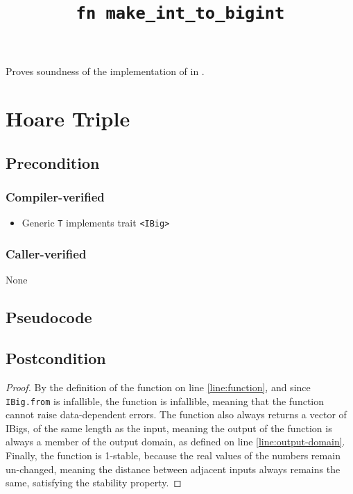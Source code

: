 \documentclass{article}
\title{\texttt{fn make\_int\_to\_bigint}}
\author{\MichaelShoemateAuthor}
\date{}
\begin{document}
\maketitle

\contrib
Proves soundness of the implementation of  in .

\section{Hoare Triple}
\subsection*{Precondition}
\subsubsection*{Compiler-verified}

\begin{itemize}
    \item Generic \texttt{T} implements trait \texttt{<IBig>}
\end{itemize}

\subsubsection*{Caller-verified}
None

\subsection*{Pseudocode}


\subsection*{Postcondition}
\begin{theorem}
\end{theorem}

\begin{proof}
    By the definition of the function on line \ref{line:function},
    and since \texttt{IBig.from} is infallible, the function is infallible,
    meaning that the function cannot raise data-dependent errors.
    The function also always returns a vector of IBigs, of the same length as the input,
    meaning the output of the function is always a member of the output domain,
    as defined on line \ref{line:output-domain}.
    Finally, the function is 1-stable, because the real values of the numbers remain un-changed,
    meaning the distance between adjacent inputs always remains the same, satisfying the stability property.
\end{proof}
\end{document}
